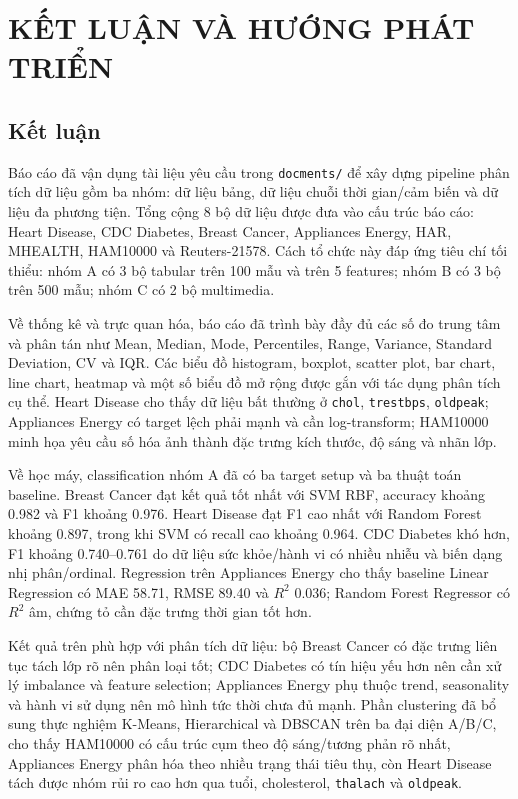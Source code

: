 ﻿\chapter{KẾT LUẬN VÀ HƯỚNG PHÁT TRIỂN}

\startcontents[chapters]

\section{Kết luận}

Báo cáo đã vận dụng tài liệu yêu cầu trong \texttt{docments/} để xây dựng pipeline phân tích dữ liệu gồm ba nhóm: dữ liệu bảng, dữ liệu chuỗi thời gian/cảm biến và dữ liệu đa phương tiện. Tổng cộng 8 bộ dữ liệu được đưa vào cấu trúc báo cáo: Heart Disease, CDC Diabetes, Breast Cancer, Appliances Energy, HAR, MHEALTH, HAM10000 và Reuters-21578. Cách tổ chức này đáp ứng tiêu chí tối thiểu: nhóm A có 3 bộ tabular trên 100 mẫu và trên 5 features; nhóm B có 3 bộ trên 500 mẫu; nhóm C có 2 bộ multimedia.

Về thống kê và trực quan hóa, báo cáo đã trình bày đầy đủ các số đo trung tâm và phân tán như Mean, Median, Mode, Percentiles, Range, Variance, Standard Deviation, CV và IQR. Các biểu đồ histogram, boxplot, scatter plot, bar chart, line chart, heatmap và một số biểu đồ mở rộng được gắn với tác dụng phân tích cụ thể. Heart Disease cho thấy dữ liệu bất thường ở \texttt{chol}, \texttt{trestbps}, \texttt{oldpeak}; Appliances Energy có target lệch phải mạnh và cần log-transform; HAM10000 minh họa yêu cầu số hóa ảnh thành đặc trưng kích thước, độ sáng và nhãn lớp.

Về học máy, classification nhóm A đã có ba target setup và ba thuật toán baseline. Breast Cancer đạt kết quả tốt nhất với SVM RBF, accuracy khoảng 0.982 và F1 khoảng 0.976. Heart Disease đạt F1 cao nhất với Random Forest khoảng 0.897, trong khi SVM có recall cao khoảng 0.964. CDC Diabetes khó hơn, F1 khoảng 0.740--0.761 do dữ liệu sức khỏe/hành vi có nhiều nhiễu và biến dạng nhị phân/ordinal. Regression trên Appliances Energy cho thấy baseline Linear Regression có MAE 58.71, RMSE 89.40 và $R^2$ 0.036; Random Forest Regressor có $R^2$ âm, chứng tỏ cần đặc trưng thời gian tốt hơn.

Kết quả trên phù hợp với phân tích dữ liệu: bộ Breast Cancer có đặc trưng liên tục tách lớp rõ nên phân loại tốt; CDC Diabetes có tín hiệu yếu hơn nên cần xử lý imbalance và feature selection; Appliances Energy phụ thuộc trend, seasonality và hành vi sử dụng nên mô hình tức thời chưa đủ mạnh. Phần clustering đã bổ sung thực nghiệm K-Means, Hierarchical và DBSCAN trên ba đại diện A/B/C, cho thấy HAM10000 có cấu trúc cụm theo độ sáng/tương phản rõ nhất, Appliances Energy phân hóa theo nhiều trạng thái tiêu thụ, còn Heart Disease tách được nhóm rủi ro cao hơn qua tuổi, cholesterol, \texttt{thalach} và \texttt{oldpeak}.

